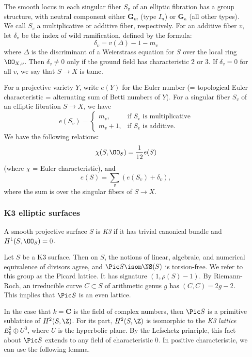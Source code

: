 \documentclass{article}
\begin{document}
The smooth locus in each singular fiber $S_v$ of an elliptic fibration has a group structure, with neutral component either $\mathbf{G}_m$ (type $I_n$) or $\mathbf{G}_a$ (all other types).  We call $S_v$ a multiplicative or additive fiber, respectively.  
For an additive fiber $v$, let $\delta_v$ be the index of wild ramification, defined by the formula:
\[ \delta_v = v(\Delta) - 1 - m_v \]
where $\Delta$ is the discriminant of a Weierstrass equation for $S$ over the local ring $\OO_{X,v}$.  Then $\delta_v\neq 0$ only if the ground field has characteristic 2 or 3.  If $\delta_v=0$ for all $v$, we say that $S\to X$ is tame.  

For a projective variety $Y$, write $e(Y)$ for the Euler number (= topological Euler characteristic = alternating sum of Betti numbers of $Y$).  For a singular fiber $S_v$ of an elliptic fibration $S\to X$, we have 
\begin{equation}
\label{EqEulerNumberFormula}
 e(S_v)=\begin{cases} m_v, & \text{if $S_v$ is multiplicative} \\ m_v+1, & \text{if $S_v$ is additive.} \end{cases} 
\end{equation}
We have the following relations:
\begin{equation}
\label{EqEulerNumberChi}
\chi(S,\OO_S) = \frac{1}{12}e(S) 
\end{equation}
(where $\chi$ = Euler characteristic), and 
\begin{equation}
e(S) = \sum_v (e(S_v)+\delta_v),
\end{equation}
where the sum is over the singular fibers of $S\to X$.


\subsubsection{K3 elliptic surfaces} A smooth projective surface $S$ is {\em K3} if it has trivial canonical bundle and $H^1(S,\OO_S)=0$.  

Let $S$ be a K3 surface.  Then on $S$, the notions of linear, algebraic, and numerical equivalence of divisors agree, and $\Pic S\isom \NS(S)$ is torsion-free.   We refer to this group as the Picard lattice. It has signature $(1,\rho(S)-1)$.  By Riemann-Roch, an irreducible curve $C\subset S$ of arithmetic genus $g$ has $(C,C)=2g-2$.  This implies that $\Pic S$ is an even lattice.  

In the case that $k=\mathbf{C}$ is the field of complex numbers, then $\Pic S$ is a primitive sublattice of $H^2(S,\Z)$.  For its part, $H^2(S,\Z)$ is isomorphic to the {\em K3 lattice} $E_8^2\oplus U^3$, where $U$ is the hyperbolic plane.  By the Lefschetz principle, this fact about $\Pic S$ extends to any field of characteristic 0.  In positive characteristic, we can use the following lemma.
\end{document}
